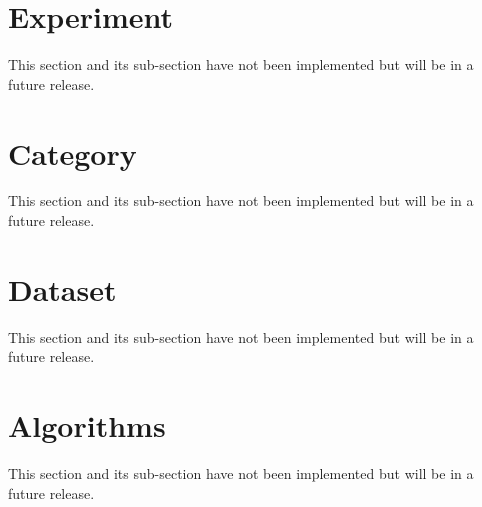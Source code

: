 \documentclass[11pt,a4paper]{article}
\begin{document}
\section{Experiment}
This section and its sub-section have not been implemented but will be in a future release.

\section{Category}
This section and its sub-section have not been implemented but will be in a future release.

\section{Dataset}
This section and its sub-section have not been implemented but will be in a future release.

\section{Algorithms}
This section and its sub-section have not been implemented but will be in a future release.
\end{document}
